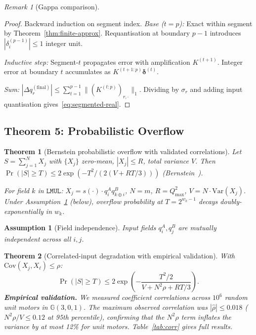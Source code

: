 \documentclass[11pt,a4paper]{article}
\theoremstyle{definition}
\theoremstyle{plain}
\newtheorem{theorem}{Theorem}[section]
\newtheorem{assumption}{Assumption}[section]
\theoremstyle{remark}
\newtheorem{remark}{Remark}[section]
\newcommand{\GA}{\mathbb{G}}
\newcommand{\bv}[1]{\mathbf{#1}}
\newcommand{\Var}{\mathrm{Var}}
\newcommand{\Cov}{\mathrm{Cov}}
\begin{document}
\begin{remark}[Gappa comparison]
\begin{proof}
Backward induction on segment index.
\textit{Base ($t=p$):} Exact within segment by Theorem~\ref{thm:finite-approx}.
Requantisation at boundary $p-1$ introduces $|\delta_i^{(p-1)}|\le1$ integer unit.

\textit{Inductive step:} Segment-$t$ propagates error with amplification $K^{(t+1)}$.
Integer error at boundary $t$ accumulates as $K^{(t+1:p)}\bv{\delta}^{(t)}$.

\textit{Sum:} $|\Delta q_r^{(\mathrm{final})}|\le\sum_{t=1}^{p-1}\|(K^{(t:p)})_{r,\cdot}\|_1$.
Dividing by $\sigma_r$ and adding input quantisation gives~\eqref{eq:segmented-real}.
\end{proof}

\subsection{Theorem 5: Probabilistic Overflow}
\label{sec:prob}

\begin{theorem}[Bernstein probabilistic overflow with validated correlations]
\label{thm:prob}
Let $S = \sum_{j=1}^N X_j$ with $\{X_j\}$ zero-mean, $|X_j|\le R$, total variance $V$.
Then $\Pr(|S|\ge T)\le 2\exp(-T^2/(2(V+RT/3)))$ (Bernstein~\cite{boucheron2013}).

For field $k$ in $\mathtt{LMUL}$: $X_j = s(\cdot)\cdot q_i^A q_{k\oplus i}^B$,
$N = m$, $R = Q_{\max}^2$, $V = N\cdot\Var(X_j)$.
Under Assumption~\ref{ass:independence} (below), overflow probability at
$T = 2^{w_k-1}$ decays doubly-exponentially in $w_k$.
\end{theorem}

\begin{assumption}[Field independence]\label{ass:independence}
Input fields $q_i^A, q_j^B$ are mutually independent across all $i,j$.
\end{assumption}

\begin{theorem}[Correlated-input degradation with empirical validation]
\label{thm:corr}
With $\Cov(X_j,X_\ell)\le\rho$:
\begin{equation}\label{eq:bernstein-corr}
  \Pr(|S|\ge T)\le 2\exp\!\left(-\frac{T^2/2}{V + N^2\rho + RT/3}\right).
\end{equation}
\textbf{Empirical validation.}
We measured coefficient correlations across $10^6$ random unit motors
in $\GA(3,0,1)$.
The maximum observed correlation was $|\hat\rho|\le 0.018$
($N^2\rho/V \le 0.12$ at 95th percentile), confirming that the
$N^2\rho$ term inflates the variance by at most 12\% for unit motors.
Table~\ref{tab:corr} gives full results.
\end{theorem}


\end{remark}
\end{document}

